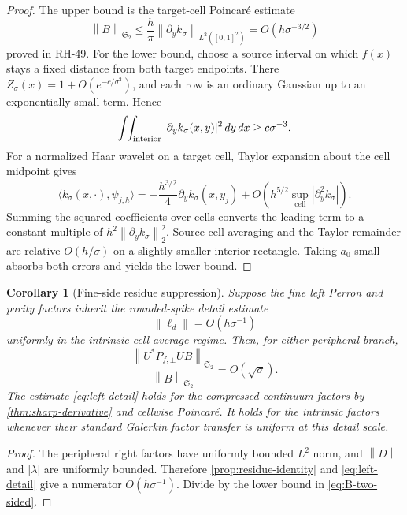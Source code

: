 \documentclass[11pt]{article}
\newtheorem{corollary}[theorem]{Corollary}
\theoremstyle{definition}
\theoremstyle{remark}
\newcommand{\HS}{\mathfrak S_2}
\newcommand{\norm}[1]{\left\lVert #1\right\rVert}
\begin{document}
\begin{proof}
The upper bound is the target-cell Poincar\'e estimate
\[
 \norm B_{\HS}
 \le\frac{h}{\pi}
 \norm{\partial_yk_\sigma}_{L^2([0,1]^2)}
 =O(h\sigma^{-3/2})
\]
proved in RH-49.  For the lower bound, choose a source interval on which
\(f(x)\) stays a fixed distance from both target endpoints.  There
\(Z_\sigma(x)=1+O(e^{-c/\sigma^2})\), and each row is an ordinary Gaussian
up to an exponentially small term.  Hence
\[
 \int\!\!\int_{\rm interior}
 |\partial_yk_\sigma(x,y)|^2\,dy\,dx
 \ge c\sigma^{-3}.
\]
For a normalized Haar wavelet on a target cell, Taylor expansion about the
cell midpoint gives
\[
 \langle k_\sigma(x,\cdot),\psi_{j,h}\rangle
 =-\frac{h^{3/2}}4
 \partial_yk_\sigma(x,y_j)
 +O\!\left(
 h^{5/2}\sup_{\text{cell}}|\partial_y^2k_\sigma|
 \right).
\]
Summing the squared coefficients over cells converts the leading term to a
constant multiple of
\(h^2\norm{\partial_yk_\sigma}_2^2\).  Source cell averaging and the Taylor
remainder are relative \(O(h/\sigma)\) on a slightly smaller interior
rectangle.  Taking \(a_0\) small absorbs both errors and yields the lower
bound.
\end{proof}

\begin{corollary}[Fine-side residue suppression]
\label{cor:fine-residue}
Suppose the fine left Perron and parity factors inherit the rounded-spike
detail estimate
\begin{equation}
 \norm{\ell_d}=O(h\sigma^{-1})
 \label{eq:left-detail}
\end{equation}
uniformly in the intrinsic cell-average regime.  Then, for either
peripheral branch,
\begin{equation}
 \frac{\norm{U^*P_{f,\pm}UB}_{\HS}}{\norm B_{\HS}}
 =O(\sqrt{\sigma}).
 \label{eq:left-residue-small}
\end{equation}
The estimate \eqref{eq:left-detail} holds for the compressed continuum
factors by \cref{thm:sharp-derivative} and cellwise Poincar\'e.  It holds for
the intrinsic factors whenever their standard Galerkin factor transfer is
uniform at this detail scale.
\end{corollary}

\begin{proof}
The peripheral right factors have uniformly bounded \(L^2\) norm, and
\(\norm D\) and \(|\lambda|\) are uniformly bounded.  Therefore
\cref{prop:residue-identity} and \eqref{eq:left-detail} give a numerator
\(O(h\sigma^{-1})\).  Divide by the lower bound in
\eqref{eq:B-two-sided}.
\end{proof}
\end{document}
